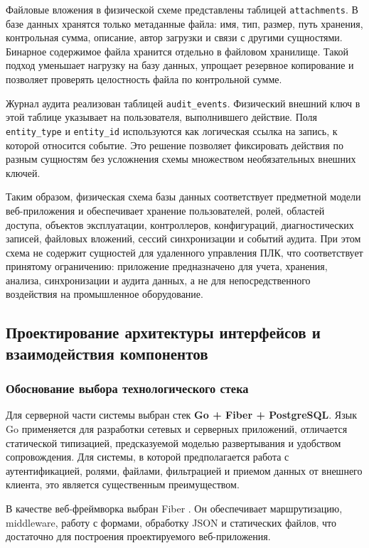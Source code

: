 Файловые вложения в физической схеме представлены таблицей \texttt{attachments}. В базе данных хранятся только метаданные файла: имя, тип, размер, путь хранения, контрольная сумма, описание, автор загрузки и связи с другими сущностями. Бинарное содержимое файла хранится отдельно в файловом хранилище. Такой подход уменьшает нагрузку на базу данных, упрощает резервное копирование и позволяет проверять целостность файла по контрольной сумме.

Журнал аудита реализован таблицей \texttt{audit\_events}. Физический внешний ключ в этой таблице указывает на пользователя, выполнившего действие. Поля \texttt{entity\_type} и \texttt{entity\_id} используются как логическая ссылка на запись, к которой относится событие. Это решение позволяет фиксировать действия по разным сущностям без усложнения схемы множеством необязательных внешних ключей.

Таким образом, физическая схема базы данных соответствует предметной модели веб-приложения и обеспечивает хранение пользователей, ролей, областей доступа, объектов эксплуатации, контроллеров, конфигураций, диагностических записей, файловых вложений, сессий синхронизации и событий аудита. При этом схема не содержит сущностей для удаленного управления ПЛК, что соответствует принятому ограничению: приложение предназначено для учета, хранения, анализа, синхронизации и аудита данных, а не для непосредственного воздействия на промышленное оборудование.

\subsection{Проектирование архитектуры интерфейсов и взаимодействия компонентов}

\subsubsection{Обоснование выбора технологического стека}

Для серверной части системы выбран стек \textbf{Go + Fiber + PostgreSQL}. Язык Go \cite{golang_official} применяется для разработки сетевых и серверных приложений, отличается статической типизацией, предсказуемой моделью развертывания и удобством сопровождения. Для системы, в которой предполагается работа с аутентификацией, ролями, файлами, фильтрацией и приемом данных от внешнего клиента, это является существенным преимуществом.

В качестве веб-фреймворка выбран Fiber \cite{fiber_official}. Он обеспечивает маршрутизацию, middleware, работу с формами, обработку JSON и статических файлов, что достаточно для построения проектируемого веб-приложения.

